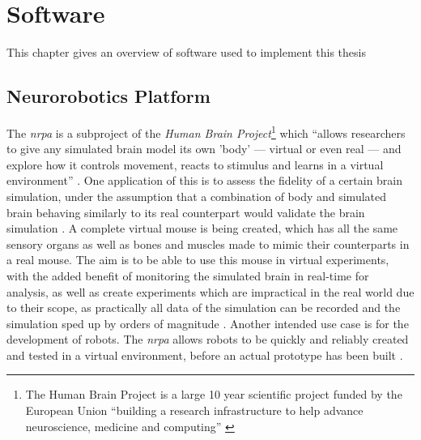 
\chapter{Software}\label{chapter:Software}

This chapter gives an overview of software used to implement this thesis


\section{Neurorobotics Platform}\label{section:NeuroroboticsPlatform}

The \textit{\gls{nrpa}} is a subproject of the \textit{Human Brain Project}\footnote{The Human Brain Project is a large 10 year scientific project funded by the European Union \enquote{building a research infrastructure to help advance neuroscience, medicine and computing} \autocite{hbpOverview}} which \enquote{allows researchers to give any simulated brain model its own 'body' — virtual or even real — and explore how it controls movement, reacts to stimulus and learns in a virtual environment} \autocite{neuroroboticsOverview}.
\newline
One application of this is to assess the fidelity of a certain brain simulation, under the assumption that a combination of body and simulated brain behaving similarly to its real counterpart would validate the brain simulation \autocite{neuroroboticsOverview}. A complete virtual mouse is being created, which has all the same sensory organs as well as bones and muscles made to mimic their counterparts in a real mouse. The aim is to be able to use this mouse in virtual experiments, with the added benefit of monitoring the simulated brain in real-time for analysis, as well as create experiments which are impractical in the real world due to their scope, as practically all data of the simulation can be recorded and the simulation sped up by orders of magnitude \autocite{neuroroboticsVision}. Another intended use case is for the development of robots. The \textit{\gls{nrpa}} allows robots to be quickly and reliably created and tested in a virtual environment, before an actual prototype has been built \autocite{neuroroboticsOverview}.
\newline

